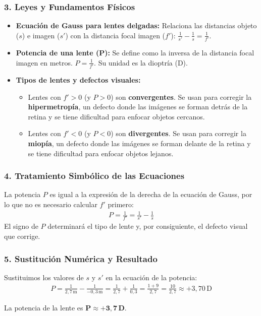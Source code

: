 \subsubsection*{3. Leyes y Fundamentos Físicos}
\begin{itemize}
    \item \textbf{Ecuación de Gauss para lentes delgadas:} Relaciona las distancias objeto ($s$) e imagen ($s'$) con la distancia focal imagen ($f'$): $\frac{1}{s'} - \frac{1}{s} = \frac{1}{f'}$.
    \item \textbf{Potencia de una lente (P):} Se define como la inversa de la distancia focal imagen en metros. $P = \frac{1}{f'}$. Su unidad es la dioptría (D).
    \item \textbf{Tipos de lentes y defectos visuales:}
    \begin{itemize}
        \item Lentes con $f' > 0$ (y $P > 0$) son \textbf{convergentes}. Se usan para corregir la \textbf{hipermetropía}, un defecto donde las imágenes se forman detrás de la retina y se tiene dificultad para enfocar objetos cercanos.
        \item Lentes con $f' < 0$ (y $P < 0$) son \textbf{divergentes}. Se usan para corregir la \textbf{miopía}, un defecto donde las imágenes se forman delante de la retina y se tiene dificultad para enfocar objetos lejanos.
    \end{itemize}
\end{itemize}

\subsubsection*{4. Tratamiento Simbólico de las Ecuaciones}
La potencia $P$ es igual a la expresión de la derecha de la ecuación de Gauss, por lo que no es necesario calcular $f'$ primero:
\begin{gather}
    P = \frac{1}{f'} = \frac{1}{s'} - \frac{1}{s}
\end{gather}
El signo de $P$ determinará el tipo de lente y, por consiguiente, el defecto visual que corrige.

\subsubsection*{5. Sustitución Numérica y Resultado}
Sustituimos los valores de $s$ y $s'$ en la ecuación de la potencia:
\begin{gather}
    P = \frac{1}{2,7\,\text{m}} - \frac{1}{-0,3\,\text{m}} = \frac{1}{2,7} + \frac{1}{0,3} = \frac{1 + 9}{2,7} = \frac{10}{2,7} \approx +3,70\,\text{D}
\end{gather}
\begin{cajaresultado}
    La potencia de la lente es $\boldsymbol{P \approx +3,7\,\textbf{D}}$.
\end{cajaresultado}
